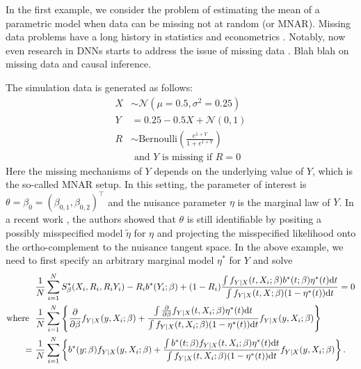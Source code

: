\documentclass[11pt]{article}
\def\calN{\mathcal{N}}
\begin{document}
\begin{example}
\label{eg:mnar}
In the first example, we consider the problem of estimating the mean of a parametric model when data can be missing not at random (or MNAR). Missing data problems have a long history in statistics and econometrics \citep{rubin1976inference}. Notably, now even research in DNNs starts to address the issue of missing data \citep{smieja2018processing}. Blah blah on missing data and causal inference.

The simulation data is generated as follows:
\begin{align*}
X & \sim \calN (\mu = 0.5, \sigma^{2} = 0.25) \\
Y & = 0.25 - 0.5 X + \calN (0, 1) \\
R & \sim \text{Bernoulli} \left( \frac{e^{1 + Y}}{1 + e^{1 + Y}} \right) \\
& \text{ and $Y$ is missing if $R = 0$}
\end{align*}
Here the missing mechanisms of $Y$ depends on the underlying value of $Y$, which is the so-called MNAR setup. In this setting, the parameter of interest is $\theta = \beta_{0} = (\beta_{0, 1}, \beta_{0, 2})^{\top}$ and the nuisance parameter $\eta$ is the marginal law of $Y$. In a recent work \citep{zhao2021versatile}, the authors showed that $\theta$ is still identifiable by positing a possibly misspecified model $\tilde{\eta}$ for $\eta$ and projecting the misspecified likelihood onto the ortho-complement to the nuisance tangent space. In the above example, we need to first specify an arbitrary marginal model $\eta^{\ast}$ for $Y$ and solve
    \begin{equation}
    \label{key}
    \begin{split}
    & \ \frac{1}{N} \sum_{i = 1}^{N} S_{\beta}^{\ast} (X_{i}, R_{i}, R_{i} Y_{i}) - R_{i} b^{\ast} (Y_{i}; \beta) + (1 - R_{i}) \frac{\int f_{Y | X} (t, X_{i}; \beta) b^{\ast} (t; \beta) \eta^{\ast} (t) \mathrm{d} t}{\int f_{Y | X} (t, X; \beta) (1 - \eta^{\ast} (t)) \mathrm{d} t} = 0 \\
    \text{where } & \ \frac{1}{N} \sum_{i = 1}^{N} \left\{ \frac{\partial}{\partial \beta} f_{Y | X} (y, X_{i}; \beta) + \frac{\int \frac{\partial}{\partial \beta} f_{Y | X} (t, X_{i}; \beta) \eta^{\ast} (t) \mathrm{d} t}{\int f_{Y | X} (t, X_{i}; \beta) (1 - \eta^{\ast} (t)) \mathrm{d} t} f_{Y | X} (y, X_{i}; \beta) \right\} \\
    = & \ \frac{1}{N} \sum_{i = 1}^{N} \left\{ b^{\ast} (y; \beta) f_{Y | X} (y, X_{i}; \beta) + \frac{\int b^{\ast} (t; \beta) f_{Y | X} (t, X_{i}; \beta) \eta^{\ast} (t) \mathrm{d} t}{\int f_{Y | X} (t, X_{i}; \beta) (1 - \eta^{\ast} (t)) \mathrm{d} t} f_{Y | X} (y, X_{i}; \beta) \right\}.
    \end{split}
    \end{equation}
\end{example}
\end{document}
